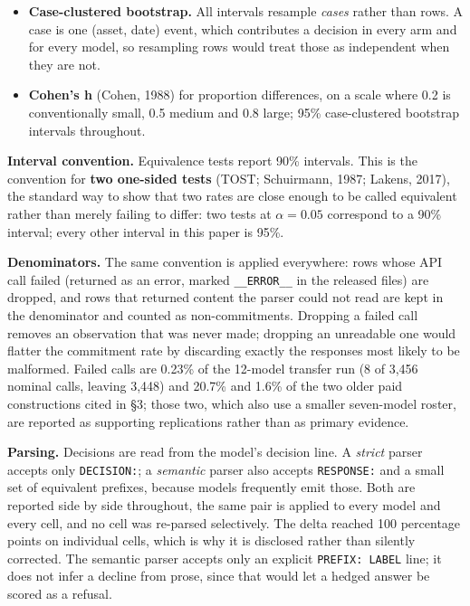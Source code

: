\documentclass[10pt]{article}
\begin{document}
\begin{itemize}[leftmargin=1.4em]
\item \textbf{Case-clustered bootstrap.} All intervals resample \textit{cases} rather than rows. A case is one (asset, date) event, which contributes a decision in every arm and for every model, so resampling rows would treat those as independent when they are not.
\item \textbf{Cohen's h} (Cohen, 1988) for proportion differences, on a scale where 0.2 is conventionally small, 0.5 medium and 0.8 large; 95\% case-clustered bootstrap intervals throughout.
\end{itemize}

\textbf{Interval convention.} Equivalence tests report 90\% intervals. This is the convention for \textbf{two one-sided tests} (TOST; Schuirmann, 1987; Lakens, 2017), the standard way to show that two rates are close enough to be called equivalent rather than merely failing to differ: two tests at $\alpha = 0.05$ correspond to a 90\% interval; every other interval in this paper is 95\%.

\textbf{Denominators.} The same convention is applied everywhere: rows whose API call failed (returned as an error, marked \texttt{\_\_ERROR\_\_} in the released files) are dropped, and rows that returned content the parser could not read are kept in the denominator and counted as non-commitments. Dropping a failed call removes an observation that was never made; dropping an unreadable one would flatter the commitment rate by discarding exactly the responses most likely to be malformed. Failed calls are 0.23\% of the 12-model transfer run (8 of 3,456 nominal calls, leaving 3,448) and 20.7\% and 1.6\% of the two older paid constructions cited in \S3; those two, which also use a smaller seven-model roster, are reported as supporting replications rather than as primary evidence.

\textbf{Parsing.} Decisions are read from the model's decision line. A \textit{strict} parser accepts only \texttt{DECISION:}; a \textit{semantic} parser also accepts \texttt{RESPONSE:} and a small set of equivalent prefixes, because models frequently emit those. Both are reported side by side throughout, the same pair is applied to every model and every cell, and no cell was re-parsed selectively. The delta reached 100 percentage points on individual cells, which is why it is disclosed rather than silently corrected. The semantic parser accepts only an explicit \texttt{PREFIX: LABEL} line; it does not infer a decline from prose, since that would let a hedged answer be scored as a refusal.
\end{document}
